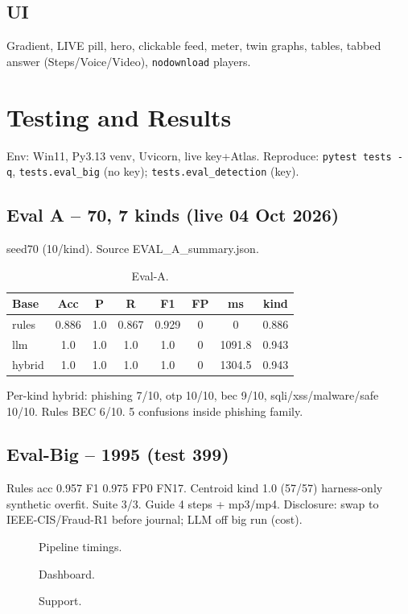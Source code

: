 \documentclass[11pt,a4paper]{article}
\begin{document}
\subsection{UI}
Gradient, LIVE pill, hero, clickable feed, meter, twin graphs, tables, tabbed answer (Steps/Voice/Video), \texttt{nodownload} players.
\section{Testing and Results}
Env: Win11, Py3.13 venv, Uvicorn, live key+Atlas. Reproduce: \texttt{pytest tests -q}, \texttt{tests.eval\_big} (no key); \texttt{tests.eval\_detection} (key).
\subsection{Eval A -- 70, 7 kinds (live 04 Oct 2026)}
seed70 (10/kind). Source EVAL\_A\_summary.json.
\begin{table}[h]\centering\caption{Eval-A.}\begin{tabular}{@{}lccccccc@{}} \toprule Base & Acc & P & R & F1 & FP & ms & kind\\\midrule rules & 0.886 & 1.0 & 0.867 & 0.929 & 0 & 0 & 0.886\\
llm & 1.0 & 1.0 & 1.0 & 1.0 & 0 & 1091.8 & 0.943\\
hybrid & 1.0 & 1.0 & 1.0 & 1.0 & 0 & 1304.5 & 0.943\\\bottomrule\end{tabular}\end{table}
Per-kind hybrid: phishing 7/10, otp 10/10, bec 9/10, sqli/xss/malware/safe 10/10. Rules BEC 6/10. 5 confusions inside phishing family.
\subsection{Eval-Big -- 1995 (test 399)}
Rules acc 0.957 F1 0.975 FP0 FN17. Centroid kind 1.0 (57/57) harness-only synthetic overfit. Suite 3/3. Guide 4 steps + mp3/mp4. Disclosure: swap to IEEE-CIS/Fraud-R1 \cite{FinFraud25,FraudR125} before journal; LLM off big run (cost).
\begin{figure}[h]\centering{}\caption{Pipeline timings.}\end{figure}
\begin{figure}[h]\centering{}\caption{Dashboard.}\end{figure}
\begin{figure}[h]\centering{}\caption{Support.}\end{figure}
\end{document}
